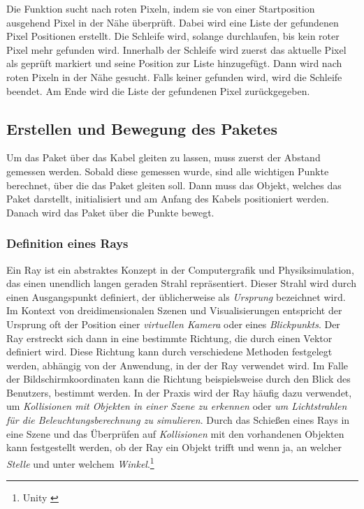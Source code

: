 Die Funktion sucht nach roten Pixeln, indem sie von einer Startposition ausgehend Pixel in der Nähe überprüft. Dabei wird eine Liste der gefundenen Pixel Positionen erstellt. Die Schleife wird, solange durchlaufen, bis kein roter Pixel mehr gefunden wird. Innerhalb der Schleife wird zuerst das aktuelle Pixel als geprüft markiert und seine Position zur Liste hinzugefügt. Dann wird nach roten Pixeln in der Nähe gesucht. Falls keiner gefunden wird, wird die Schleife beendet. Am Ende wird die Liste der gefundenen Pixel zurückgegeben.


\subsection{Erstellen und Bewegung des Paketes}
Um das Paket über das Kabel gleiten zu lassen, muss zuerst der Abstand gemessen werden. Sobald diese gemessen wurde, sind alle wichtigen Punkte berechnet, über die das Paket gleiten soll. Dann muss das Objekt, welches das Paket darstellt, initialisiert und am Anfang des Kabels positioniert werden. Danach wird das Paket über die Punkte bewegt.

\subsubsection{\label{sec:Raycast}Definition eines Rays}
Ein Ray ist ein abstraktes Konzept in der Computergrafik und Physiksimulation, das einen unendlich langen geraden Strahl repräsentiert. Dieser Strahl wird durch einen Ausgangspunkt definiert, der üblicherweise als \textit{Ursprung} bezeichnet wird. Im Kontext von dreidimensionalen Szenen und Visualisierungen entspricht der Ursprung oft der Position einer \textit{virtuellen Kamera} oder eines \textit{Blickpunkts}. Der Ray erstreckt sich dann in eine bestimmte Richtung, die durch einen Vektor definiert wird. Diese Richtung kann durch verschiedene Methoden festgelegt werden, abhängig von der Anwendung, in der der Ray verwendet wird. Im Falle der Bildschirmkoordinaten kann die Richtung beispielsweise durch  den Blick des Benutzers, bestimmt werden. In der Praxis wird der Ray häufig dazu verwendet, um \textit{Kollisionen mit Objekten in einer Szene zu erkennen} oder \textit{um Lichtstrahlen für die Beleuchtungsberechnung zu simulieren}. Durch das Schießen eines Rays in eine Szene und das Überprüfen auf \textit{Kollisionen} mit den vorhandenen Objekten kann festgestellt werden, ob der Ray ein Objekt trifft und wenn ja, an welcher \textit{Stelle} und unter welchem \textit{Winkel}.\protect\footnote{Unity \cite{Raycast}}\\

